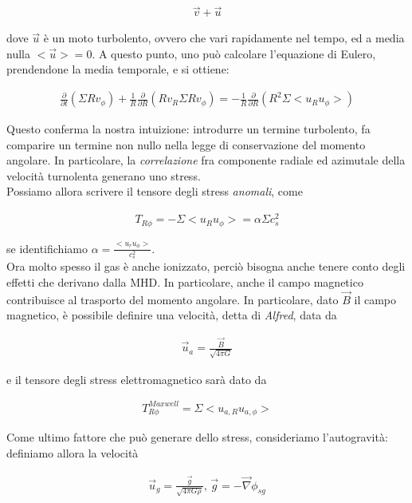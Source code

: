 \documentclass{report}
\begin{document}
\begin{align}
    \vec{v} + \vec{u}
\end{align}

dove \(\vec{u}\) è un moto turbolento, ovvero che vari rapidamente nel tempo, ed a media nulla \(<\vec{u}> = 0\). A questo punto, uno può calcolare l'equazione di Eulero, prendendone la media temporale, e si ottiene: 

\begin{align}
    \frac{\partial}{\partial t}(\Sigma R v_{\phi}) + \frac{1}{R}\frac{\partial}{\partial R}(Rv_R \Sigma R v_\phi) = -\frac{1}{R}\frac{\partial}{\partial R}(R^2\Sigma <u_Ru_\phi>)
\end{align}

Questo conferma la nostra intuizione: introdurre un termine turbolento, fa comparire un termine non nullo nella legge di conservazione del momento angolare. In particolare, la \emph{correlazione} fra componente radiale ed azimutale della velocità turnolenta generano uno stress. \\

Possiamo allora scrivere il tensore degli stress \emph{anomali}, come 

\begin{align}
    T_{R\phi} = -\Sigma <u_R u_\phi> = \alpha \Sigma c_s^2
\end{align}

se identifichiamo \(\alpha = \frac{<u_r u_\phi>}{c_s^2}\). \\

Ora molto spesso il gas è anche ionizzato, perciò bisogna anche tenere conto degli effetti che derivano dalla MHD. In particolare, anche il campo magnetico contribuisce al trasporto del momento angolare. In particolare, dato \(\vec{B}\) il campo magnetico, è possibile definire una velocità, detta di \emph{Alfred}, data da 

\begin{align}
    \vec{u}_a = \frac{\vec{B}}{\sqrt{4\pi G}}
\end{align}

e il tensore degli stress elettromagnetico sarà dato da 

\begin{align}
    T^{Maxwell}_{R\phi} = \Sigma <u_{a, R}u_{a, \phi}>
\end{align}

Come ultimo fattore che può generare dello stress, consideriamo l'autogravità: definiamo allora la velocità 

\begin{align}
    \vec{u}_g = \frac{\vec{g}}{\sqrt{4\pi G \rho}}, \, \vec{g} = -\vec{\nabla}\phi_{sg}
\end{align}
\end{document}
